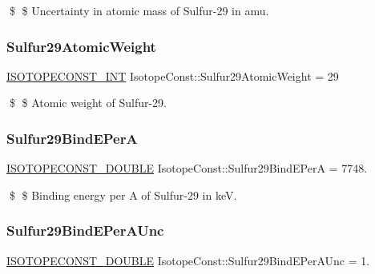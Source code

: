 \$ \$ Uncertainty in atomic mass of Sulfur-\/29 in amu. \mbox{\label{group___isotope_const-_sulfur-_s29_ga6b56df385390b0bcc94ae4f94f64022f}} 
\subsubsection{\texorpdfstring{Sulfur29\+Atomic\+Weight}{Sulfur29AtomicWeight}}
{\footnotesize\ttfamily \mbox{\hyperlink{group___isotope_const-_macros_ga5f18360b3e99483a35c32d789e62621c}{I\+S\+O\+T\+O\+P\+E\+C\+O\+N\+S\+T\+\_\+\+I\+NT}} Isotope\+Const\+::\+Sulfur29\+Atomic\+Weight = 29}

\$ \$ Atomic weight of Sulfur-\/29. \mbox{\label{group___isotope_const-_sulfur-_s29_gaeea8afc8769252a604188e1648e469c7}} 
\subsubsection{\texorpdfstring{Sulfur29\+Bind\+E\+PerA}{Sulfur29BindEPerA}}
{\footnotesize\ttfamily \mbox{\hyperlink{group___isotope_const-_macros_ga8f45a7272ce02c0b4c65c44636ed719a}{I\+S\+O\+T\+O\+P\+E\+C\+O\+N\+S\+T\+\_\+\+D\+O\+U\+B\+LE}} Isotope\+Const\+::\+Sulfur29\+Bind\+E\+PerA = 7748.}

\$ \$ Binding energy per A of Sulfur-\/29 in keV. \mbox{\label{group___isotope_const-_sulfur-_s29_gaeecbf1f4280450140afec769d498f53f}} 
\subsubsection{\texorpdfstring{Sulfur29\+Bind\+E\+Per\+A\+Unc}{Sulfur29BindEPerAUnc}}
{\footnotesize\ttfamily \mbox{\hyperlink{group___isotope_const-_macros_ga8f45a7272ce02c0b4c65c44636ed719a}{I\+S\+O\+T\+O\+P\+E\+C\+O\+N\+S\+T\+\_\+\+D\+O\+U\+B\+LE}} Isotope\+Const\+::\+Sulfur29\+Bind\+E\+Per\+A\+Unc = 1.}

